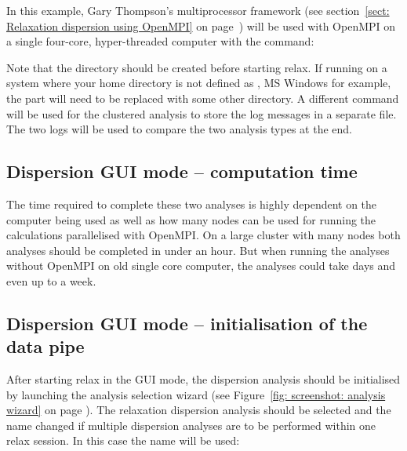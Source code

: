 In this example, Gary Thompson's multiprocessor framework (see section~\ref{sect: Relaxation dispersion using OpenMPI} on page~\pageref{sect: Relaxation dispersion using OpenMPI}) will be used with OpenMPI on a single four-core, hyper-threaded computer with the command:


Note that the  directory should be created before starting relax.
If running on a system where your home directory is not defined as \directory{$\sim$\ossep{}}, MS Windows for example, the \directory{$\sim$} part will need to be replaced with some other directory.
A different command will be used for the clustered analysis to store the log messages in a separate file.
The two logs will be used to compare the two analysis types at the end.


\subsection{Dispersion GUI mode -- computation time}

The time required to complete these two analyses is highly dependent on the computer being used as well as how many nodes can be used for running the calculations parallelised with OpenMPI.
On a large cluster with many nodes both analyses should be completed in under an hour.
But when running the analyses without OpenMPI on old single core computer, the analyses could take days and even up to a week.



\subsection{Dispersion GUI mode -- initialisation of the data pipe}

After starting relax in the GUI mode, the dispersion analysis should be initialised by launching the analysis selection wizard (see Figure~\ref{fig: screenshot: analysis wizard} on page \pageref{fig: screenshot: analysis wizard}).
The relaxation dispersion analysis should be selected and the name changed if multiple dispersion analyses are to be performed within one relax session.
In this case the name  will be used:

